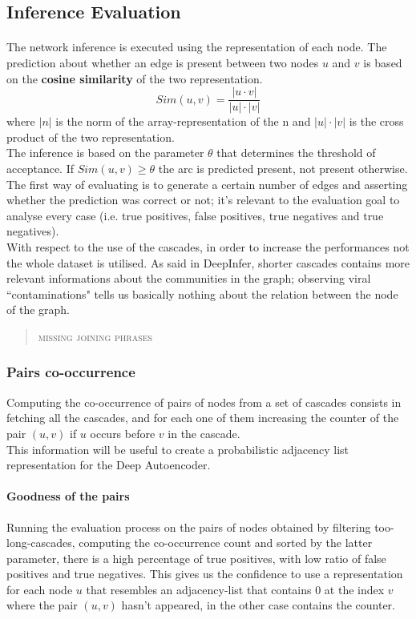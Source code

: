 \documentclass{article}
\begin{document}
		\subsection{Inference Evaluation}
			\paragraph{}
			The network inference is executed using the representation of each node. The prediction about whether an edge is present between two nodes $u$ and $v$ is based on the \textbf{cosine similarity} of the two representation.
			$$ Sim(u,v) = \frac{|u\cdot v|}{|u|\cdot |v|} $$
			where $|n|$ is the norm of the array-representation of the n and $|u|\cdot |v|$ is the cross product of the two representation.\\
			The inference is based on the parameter $\theta$ that determines the threshold of acceptance. If $Sim(u,v) \ge \theta$ the arc is predicted present, not present otherwise.\\
			The first way of evaluating is to generate a certain number of edges and asserting whether the prediction was correct or not; it's relevant to the evaluation goal to analyse every case (i.e. true positives, false positives, true negatives and true negatives).\medskip\\

			With respect to the use of the cascades, in order to increase the performances not the whole dataset is utilised. As said in DeepInfer, shorter cascades contains more relevant informations about the communities in the graph; observing viral \textquotedblleft contaminations" tells us basically nothing about the relation between the node of the graph. \\
			\begin{quote}
				\centering
				\textsc{missing joining phrases}\\
			\end{quote}
			\subsubsection{Pairs co-occurrence}
			Computing the co-occurrence of pairs of nodes from a set of cascades consists in fetching all the cascades, and for each one of them increasing the counter of the pair $(u,v)$ if $u$ occurs before $v$ in the cascade.\\
			This information will be useful to create a probabilistic adjacency list representation for the Deep Autoencoder.
			\paragraph{Goodness of the pairs}
			Running the evaluation process on the pairs of nodes obtained by filtering too-long-cascades, computing the co-occurrence count and sorted by the latter parameter, there is a high percentage of true positives, with low ratio of false positives and true negatives. This gives us the confidence to use a representation for each node $u$ that resembles an adjacency-list that contains 0 at the index $v$ where the pair $(u,v)$ hasn't appeared, in the other case contains the counter.\medskip\\
			
\end{document}
